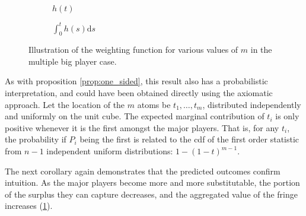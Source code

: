 \documentclass[a4paper]{article}
\newcommand{\ds}{\mathrm{d}s}
\begin{document}
\begin{figure}[ht]
    \centering
    \begin{subfigure}[b]{0.45\textwidth}
        \centering
        \caption{$h(t)$}
    \end{subfigure}
    \begin{subfigure}[b]{0.45\textwidth}
        \centering
        \caption{$\int_0^t h(s) \ds$}
    \end{subfigure}
    \caption{Illustration of the weighting function for various values of $m$ in the multiple big player case.}
    \label{fig:multiple_platforms}
\end{figure}

As with proposition \ref{prop:one_sided}, this result also has a probabilistic interpretation, and could have been obtained directly using the axiomatic approach.
Let the location of the $m$ atoms be $t_1, \dots, t_m$, distributed independently and uniformly on the unit cube.
The expected marginal contribution of $t_i$ is only positive whenever it is the first amongst the major players.
That is, for any $t_i$, the probability if $P_i$ being the first is related to the cdf of the first order statistic from $n-1$ independent uniform distributions: $1 - (1-t)^{m-1}$.


The next corollary again demonstrates that the predicted outcomes confirm intuition.
As the major players become more and more substitutable, the portion of the surplus they can capture decreases, and the aggregated value of the fringe increases (\cref{fig:multiple_platforms}).
\end{document}

